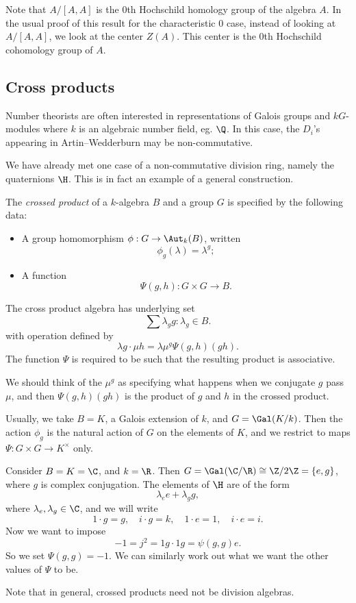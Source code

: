 \documentclass[a4paper]{article}
\begin{document}
Note that $A/[A, A]$ is the $0$th Hochschild homology group of the algebra $A$. In the usual proof of this result for the characteristic $0$ case, instead of looking at $A/[A, A]$, we look at the center $Z(A)$. This center is the $0$th Hochschild cohomology group of $A$.

\subsection{Cross products}
Number theorists are often interested in representations of Galois groups and $kG$-modules where $k$ is an algebraic number field, eg. $\Q$. In this case, the $D_i$'s appearing in Artin--Wedderburn may be non-commutative.

We have already met one case of a non-commutative division ring, namely the quaternions $\H$. This is in fact an example of a general construction.

\begin{defi}
  The \emph{crossed product} of a $k$-algebra $B$ and a group $G$ is specified by the following data:
  \begin{itemize}
    \item A group homomorphism $\phi: G \to \Aut_k(B)$, written
      \[
        \phi_g(\lambda) = \lambda^g;
      \]
    \item A function
      \[
        \Psi(g, h): G \times G \to B.
      \]
  \end{itemize}
  The cross product algebra has underlying set
  \[
    \sum \lambda_g g: \lambda_g \in B.
  \]
  with operation defined by
  \[
    \lambda g \cdot \mu h = \lambda \mu^g \Psi(g, h) (gh).
  \]
  The function $\Psi$ is required to be such that the resulting product is associative.
\end{defi}
We should think of the $\mu^g$ as specifying what happens when we conjugate $g$ pass $\mu$, and then $\Psi(g, h) (gh)$ is the product of $g$ and $h$ in the crossed product.

Usually, we take $B = K$, a Galois extension of $k$, and $G = \Gal(K/k)$. Then the action $\phi_g$ is the natural action of $G$ on the elements of $K$, and we restrict to maps $\Psi: G \times G \to K^\times$ only.

\begin{eg}
  Consider $B = K = \C$, and $k = \R$. Then $G = \Gal(\C/\R) \cong \Z/2\Z = \{e, g\}$, where $g$ is complex conjugation. The elements of $\H$ are of the form
  \[
    \lambda_e e + \lambda_g g,
  \]
  where $\lambda_e, \lambda_g \in \C$, and we will write
  \[
    1 \cdot g = g,\quad i \cdot g = k,\quad 1 \cdot e = 1,\quad i \cdot e = i.
  \]
  Now we want to impose
  \[
    -1 = j^2 = 1g \cdot 1g = \psi(g, g) e.
  \]
  So we set $\Psi(g, g) = -1$. We can similarly work out what we want the other values of $\Psi$ to be. %
\end{eg}
Note that in general, crossed products need not be division algebras.
\end{document}
